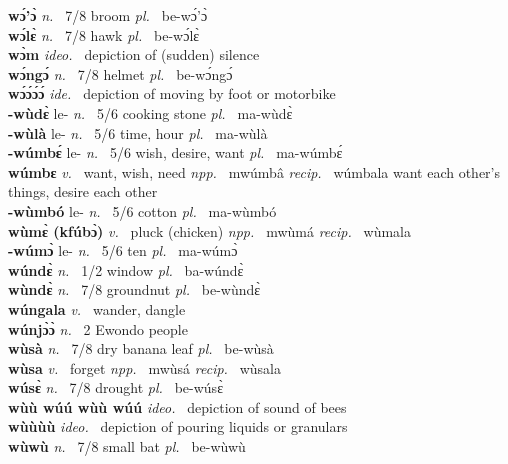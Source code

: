 {\bfseries wɔ́'ɔ̀}  {\itshape n.~} 7/8 broom {\itshape pl.~} be-wɔ́'ɔ̀    \\ 
{\bfseries wɔ́lɛ̀}  {\itshape n.~} 7/8 hawk {\itshape pl.~} be-wɔ́lɛ̀    \\ 
{\bfseries wɔ̀m}  {\itshape ideo.~} depiction of (sudden) silence    \\ 
{\bfseries wɔ́ngɔ́}  {\itshape n.~} 7/8 helmet {\itshape pl.~} be-wɔ́ngɔ́    \\ 
{\bfseries wɔ́ɔ́ɔ́ɔ́}  {\itshape ide.~} depiction of moving by foot or motorbike    \\ 
{\bfseries -wùdɛ̀} le- {\itshape n.~} 5/6 cooking stone {\itshape pl.~} ma-wùdɛ̀    \\ 
{\bfseries -wùlà} le- {\itshape n.~} 5/6 time, hour {\itshape pl.~} ma-wùlà    \\ 
{\bfseries -wúmbɛ́} le- {\itshape n.~} 5/6 wish, desire, want {\itshape pl.~} ma-wúmbɛ́    \\ 
{\bfseries wúmbɛ}  {\itshape v.~} want, wish, need   {\itshape npp.~} mwúmbâ {\itshape recip.~} wúmbala want each other's things, desire each other  \\ 
{\bfseries -wùmbó} le- {\itshape n.~} 5/6 cotton {\itshape pl.~} ma-wùmbó    \\ 
{\bfseries wùmɛ̀ (kfúbɔ̀)}  {\itshape v.~} pluck (chicken)   {\itshape npp.~} mwùmá {\itshape recip.~} wùmala  \\ 
{\bfseries -wúmɔ̀} le- {\itshape n.~} 5/6 ten {\itshape pl.~} ma-wúmɔ̀    \\ 
{\bfseries wúndɛ̀}  {\itshape n.~} 1/2 window {\itshape pl.~} ba-wúndɛ̀    \\ 
{\bfseries wùndɛ̀}  {\itshape n.~} 7/8 groundnut {\itshape pl.~} be-wùndɛ̀    \\ 
{\bfseries wúngala}  {\itshape v.~} wander, dangle     \\ 
{\bfseries wúnjɔ̀ɔ̀}  {\itshape n.~} 2 Ewondo people  \\ 
{\bfseries wùsà}  {\itshape n.~} 7/8 dry banana leaf {\itshape pl.~} be-wùsà    \\ 
{\bfseries wùsa}  {\itshape v.~} forget   {\itshape npp.~} mwùsá {\itshape recip.~} wùsala  \\ 
{\bfseries wúsɛ̀}  {\itshape n.~} 7/8 drought {\itshape pl.~} be-wúsɛ̀    \\ 
{\bfseries wùù wúú wùù wúú}  {\itshape ideo.~} depiction of sound of bees    \\ 
{\bfseries wùùùù}  {\itshape ideo.~} depiction of pouring liquids or granulars    \\ 
{\bfseries wùwù}  {\itshape n.~} 7/8 small bat {\itshape pl.~} be-wùwù    \\ 

